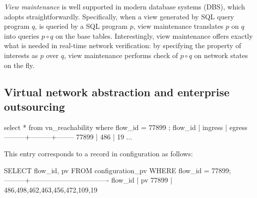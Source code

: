 \textit{View maintenance} is well supported in modern database systems
(DBS), which \Sys adopts straightforwardly. Specifically, when a view
generated by SQL query program $q$, is queried by a SQL program $p$,
view maintenance translates $p$ on $q$ into queries $p \circ q$ on the
base tables.
Interestingly, view maintenance offers exactly what is needed in
real-time network verification: by specifying the property of
interests as $p$ over $q$, view maintenance performs check of $p \circ
q$ on network states on the fly. %

% 

\subsection{Virtual network abstraction and enterprise outsourcing}

\begin{sql}
select * from vn_reachability where flow_id = 77899 ;
 flow_id | ingress | egress 
---------+---------+--------
   77899 |     486 |     19  
   ...
\end{sql}

This entry corresponds to a record in configuration as follows:
\begin{sql}
SELECT flow_id, pv FROM configuration_pv WHERE flow_id = 77899;
---------+----------------------------------
 flow_id |                pv                
   77899 | {486,498,462,463,456,472,109,19}
\end{sql}

